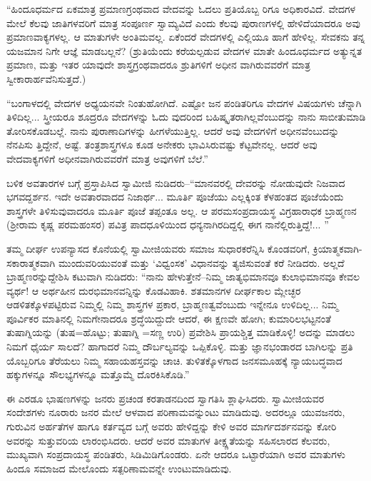 “ಹಿಂದೂಧರ್ಮದ ಏಕಮಾತ್ರ ಪ್ರಮಾಣಗ್ರಂಥವಾದ ವೇದವನ್ನು ಓದಲು ಪ್ರತಿಯೊಬ್ಬ ರಿಗೂ ಅಧಿಕಾರವಿದೆ. ವೇದಗಳ ಮೇಲೆ ಕೆಲವು ಜಾತಿಗಳವರಿಗೆ ಮಾತ್ರ ಸಂಪೂರ್ಣ ಸ್ವಾಮ್ಯವಿದೆ ಎಂದು ಕೆಲವು ಪುರಾಣಗಳಲ್ಲಿ ಹೇಳಿದೆಯಾದರೂ ಅವು ಪ್ರಮಾಣವಾಕ್ಯಗಳಲ್ಲ. ಆ ಮಾತುಗಳೇ ಅಂತಿಮವಲ್ಲ. ಏಕೆಂದರೆ ವೇದಗಳಲ್ಲಿ ಎಲ್ಲಿಯೂ ಹಾಗೆ ಹೇಳಿಲ್ಲ. ಸೇವಕನು ತನ್ನ ಯಜಮಾನ ನಿಗೇ ಆಜ್ಞೆ ಮಾಡಬಲ್ಲನೆ? (ಶ್ರುತಿಯೆಂದು ಕರೆಯಲ್ಪಡುವ ವೇದಗಳ ಮಾತೇ ಹಿಂದೂಧರ್ಮದ ಅತ್ಯುನ್ನತ ಪ್ರಮಾಣ, ಮತ್ತು ಇತರ ಯಾವುದೇ ಶಾಸ್ತ್ರಗ್ರಂಥವಾದರೂ ಶ್ರುತಿಗಳಿಗೆ ಅಧೀನ ವಾಗಿರುವವರೆಗೆ ಮಾತ್ರ ಸ್ವೀಕಾರಾರ್ಹವೆನಿಸುತ್ತದೆ.)

“ಬಂಗಾಳದಲ್ಲಿ ವೇದಗಳ ಅಧ್ಯಯನವೇ ನಿಂತುಹೋಗಿದೆ. ಎಷ್ಟೋ ಜನ ಪಂಡಿತರಿಗೂ ವೇದಗಳ ವಿಷಯಗಳು ಚೆನ್ನಾಗಿ ತಿಳಿದಿಲ್ಲ... ಸ್ತ್ರೀಯರೂ ಶೂದ್ರರೂ ವೇದಗಳನ್ನು ಓದು ವುದರಿಂದ ಬಹಿಷ್ಕೃತರಾಗಿಲ್ಲವೆಂಬುದನ್ನು ನಾನು ಸಾಬೀತುಮಾಡಿ ತೋರಿಸಕೊಡಬಲ್ಲೆ. ನಾನು ಪುರಾಣಾದಿಗಳನ್ನು ಹೀಗಳೆಯುತ್ತಿಲ್ಲ. ಆದರೆ ಅವು ವೇದಗಳಿಗೆ ಅಧೀನವೆಂಬುದನ್ನು ನೆನಪಿಸು ತ್ತಿದ್ದೇನೆ, ಅಷ್ಟೆ. ತಂತ್ರಶಾಸ್ತ್ರಗಳೂ ಕೂಡ ಅನೇಕರು ಭಾವಿಸಿರುವಷ್ಟು ಕೆಟ್ಟವೇನಲ್ಲ. ಆದರೆ ಅವು ವೇದವಾಕ್ಯಗಳಿಗೆ ಅಧೀನವಾಗಿರುವವರೆಗೆ ಮಾತ್ರ ಅವುಗಳಿಗೆ ಬೆಲೆ.”

ಬಳಿಕ ಅವತಾರಗಳ ಬಗ್ಗೆ ಪ್ರಸ್ತಾಪಿಸಿದ ಸ್ವಾಮೀಜಿ ನುಡಿದರು–“ಮಾನವರಲ್ಲಿ ದೇವರನ್ನು ನೋಡುವುದೇ ನಿಜವಾದ ಭಗವದ್ದರ್ಶನ. ಇದೇ ಅವತಾರವಾದದ ನಿಜಾರ್ಥ... ಮೂರ್ತಿ ಪೂಜೆಯು ಎಲ್ಲಕ್ಕಿಂತ ಕೆಳಹಂತದ ಪೂಜೆಯೆಂದು ಶಾಸ್ತ್ರಗಳೇ ತಿಳಿಸುವುವಾದರೂ ಮೂರ್ತಿ ಪೂಜೆ ತಪ್ಪಂತೂ ಅಲ್ಲ. ಆ ಪರಮಸಂಪ್ರದಾಯಸ್ಥ ವಿಗ್ರಹಾರಾಧಕ ಬ್ರಾಹ್ಮಣನ (ಶ್ರೀರಾಮ ಕೃಷ್ಣ ಪರಮಹಂಸರ) ಪವಿತ್ರ ಪಾದಧೂಳಿಯಿಂದ ಧನ್ಯನಾಗಿರದಿದ್ದಲ್ಲಿ ಈಗ ನಾನೆಲ್ಲಿರುತ್ತಿದ್ದೆ!... ”

ತಮ್ಮ ದೀರ್ಘ ಉಪನ್ಯಾಸದ ಕೊನೆಯಲ್ಲಿ ಸ್ವಾಮೀಜಿಯವರು ಸಮಾಜ ಸುಧಾರಕರೆನ್ನಿಸಿ ಕೊಂಡವರಿಗೆ, ಕ್ರಿಯಾತ್ಮಕವಾಗಿ-ಸಕಾರಾತ್ಮಕವಾಗಿ ಮುಂದುವರಿಯುವಂತೆ ಮತ್ತು ‘ವಿಧ್ವಂಸಕ’ ವಿಧಾನವನ್ನು ತ್ಯಜಿಸುವಂತೆ ಕರೆ ನೀಡಿದರು. ಅಲ್ಲದೆ ಬ್ರಾಹ್ಮಣರನ್ನುದ್ದೇಶಿಸಿ ಕಟುವಾಗಿ ನುಡಿದರು: “ನಾನು ಹೇಳುತ್ತೇನೆ–ನಿಮ್ಮ ಜಾತ್ಯಭಿಮಾನವೂ ಕುಲಾಭಿಮಾನವೂ ಕೇವಲ ವ್ಯರ್ಥ! ಆ ಅರ್ಥಹೀನ ದುರಭಿಮಾನವನ್ನಿನ್ನು ಕೊಡವಿಹಾಕಿ. ಶತಮಾನಗಳ ದೀರ್ಘಕಾಲ ಮ್ಲೇಚ್ಛರ ಆಡಳಿತಕ್ಕೊಳಪಟ್ಟಿರುವ ನಿಮ್ಮಲ್ಲಿ ನಿಮ್ಮ ಶಾಸ್ತ್ರಗಳ ಪ್ರಕಾರ, ಬ್ರಾಹ್ಮಣತ್ವವೆಂಬುದು ಇನ್ನೇನೂ ಉಳಿದಿಲ್ಲ... ನಿಮ್ಮ ಪೂರ್ವಿಕರ ಮಾತಿನಲ್ಲಿ ನಿಮಗೇನಾದರೂ ಶ್ರದ್ಧೆಯಿದ್ದುದೇ ಆದರೆ, ಈ ಕ್ಷಣವೇ ಹೋಗಿ; ಕುಮಾರಿಲಭಟ್ಟನಂತೆ ತುಷಾಗ್ನಿಯನ್ನು (ತುಷ=ಹೊಟ್ಟು; ತುಷಾಗ್ನಿ =ಸಣ್ಣ ಉರಿ) ಪ್ರವೇಶಿಸಿ ಪ್ರಾಯಶ್ಚಿತ್ತ ಮಾಡಿಕೊಳ್ಳಿ! ಅದನ್ನು ಮಾಡಲು ನಿಮಗೆ ಧೈರ್ಯ ಸಾಲದೆ? ಹಾಗಾದರೆ ನಿಮ್ಮ ದೌರ್ಬಲ್ಯವನ್ನು ಒಪ್ಪಿಕೊಳ್ಳಿ. ಮತ್ತು ಜ್ಞಾನಭಂಡಾರದ ಬಾಗಿಲನ್ನು ಪ್ರತಿ ಯೊಬ್ಬರಿಗೂ ತೆರೆಯಲು ನಿಮ್ಮ ಸಹಾಯಹಸ್ತವನ್ನು ಚಾಚಿ. ತುಳಿತಕ್ಕೊಳಗಾದ ಜನಸಮೂಹಕ್ಕೆ ನ್ಯಾಯಬದ್ಧವಾದ ಹಕ್ಕುಗಳನ್ನೂ ಸೌಲಭ್ಯಗಳನ್ನೂ ಮತ್ತೊಮ್ಮೆ ದೊರಕಿಸಿಕೊಡಿ.”

ಈ ಎರಡೂ ಭಾಷಣಗಳನ್ನು ಜನರು ಪ್ರಚಂಡ ಕರತಾಡನದಿಂದ ಸ್ವಾಗತಿಸಿ ಶ್ಲಾಘಿಸಿದರು. ಸ್ವಾಮೀಜಿಯವರ ಸಂದೇಶಗಳು ನೂರಾರು ಜನರ ಮೇಲೆ ಆಳವಾದ ಪರಿಣಾಮವನ್ನುಂಟು ಮಾಡಿದುವು. ಅದರಲ್ಲೂ ಯುವಜನರು, ಗುರುವಿನ ಅರ್ಹತೆಗಳ ಹಾಗೂ ಕರ್ತವ್ಯದ ಬಗ್ಗೆ ಅವರು ಹೇಳಿದ್ದನ್ನು ಕೇಳಿ ಅವರ ಮಾರ್ಗದರ್ಶನವನ್ನು ಕೋರಿ ಅವರನ್ನು ಸುತ್ತುವರಿಯ ಲಾರಂಭಿಸಿದರು. ಆದರೆ ಅವರ ಮಾತುಗಳ ತೀಕ್ಷ್ಣತೆಯನ್ನು ಸಹಿಸಲಾರದ ಕೆಲವರು, ಮುಖ್ಯವಾಗಿ ಸಂಪ್ರದಾಯಸ್ಥ ಪಂಡಿತರು, ಸಿಡಿಮಿಡಿಗೊಂಡರು. ಏನೇ ಆದರೂ ಒಟ್ಟಾರೆಯಾಗಿ ಅವರ ಮಾತುಗಳು ಹಿಂದೂ ಸಮಾಜದ ಮೇಲೊಂದು ಸತ್ಪರಿಣಾಮವನ್ನೇ ಉಂಟುಮಾಡಿದುವು.


